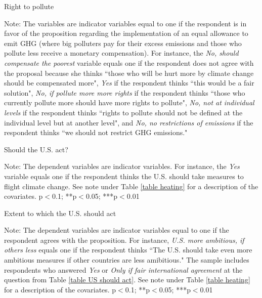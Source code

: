 \documentclass{article}
\begin{document}
\begin{landscape}
	\begin{table}[h!]
	\caption{Right to pollute}
	\begin{center}
		\scalebox{0.6}{}
	\end{center}
	{\footnotesize Note: The variables are indicator variables equal to one if the respondent is in favor of the proposition regarding the implementation of an equal allowance to emit GHG (where big polluters pay for their excess emissions and those who pollute less receive a monetary compensation). For instance, the \textit{No, should compensate the poorest} variable equals one if the respondent does not agree with the proposal because she thinks ``those who will be hurt more by climate change should be compensated more", \textit{Yes} if the respondent thinks ``this would be a fair solution", \textit{No, if pollute more more rights} if the respondent thinks ``those who currently pollute more should have more rights to pollute", \textit{No, not at individual levels} if the respondent thinks ``rights to pollute should not be defined at the individual level but at another level", and \textit{No, no restrictions of emissions} if the respondent thinks ``we should not restrict GHG emissions."}
\end{table}	
\end{landscape}

\begin{table}[h!]
	\caption{Should the U.S. act?} \label{table US should act}
	\begin{center}
		\scalebox{0.7}{}
	\end{center}
	{\footnotesize Note: The dependent variables are indicator variables. For instance, the \textit{Yes} variable equals one if the respondent thinks the U.S. should take measures to flight climate change. See note under Table \ref{table heating} for a description of the covariates.
	\newline *p$<$0.1; **p$<$0.05; ***p$<$0.01}
\end{table}	

\begin{table}[h!]
	\caption{Extent to which the U.S. should act}
	\begin{center}
		\scalebox{0.7}{}
	\end{center}
	{\footnotesize Note: The dependent variables are indicator variables equal to one if the respondent agrees with the proposition. For instance, \textit{U.S. more ambitious, if others less} equals one if the respondent thinks ``The U.S. should take even more ambitious measures if other countries are less amibitious." The sample includes respondents who answered \textit{Yes} or \textit{Only if fair international agreement} at the question from Table \ref{table US should act}.   See note under Table \ref{table heating} for a description of the covariates.
	\newline *p$<$0.1; **p$<$0.05; ***p$<$0.01}
\end{table}	
\end{document}
